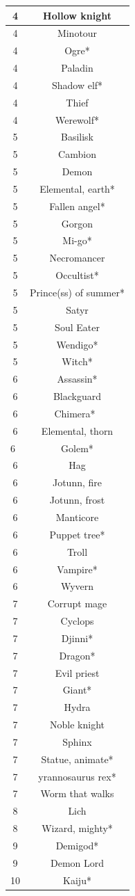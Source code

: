 \begin{longtable}{|c|c|}
4 & Hollow knight \\ \hline
4 & Minotour \\ \hline
4 & Ogre* \\ \hline
4 & Paladin \\ \hline
4 & Shadow elf* \\ \hline
4 & Thief \\ \hline
4 & Werewolf* \\ \hline
5 & Basilisk \\ \hline
5 & Cambion \\ \hline
5 & Demon \\ \hline
5 & Elemental, earth* \\ \hline
5 & Fallen angel* \\ \hline
5 & Gorgon \\ \hline
5 & Mi-go* \\ \hline
5 & Necromancer \\ \hline
5 & Occultist* \\ \hline
5 & Prince(ss) of summer* \\ \hline
5 & Satyr \\ \hline
5 & Soul Eater \\ \hline
5 & Wendigo* \\ \hline
5 & Witch* \\ \hline
6 & Assassin* \\ \hline
6 & Blackguard \\ \hline
6 & Chimera*  \\ \hline
6 & Elemental, thorn \\ \hline
6  & Golem* \\ \hline
6 & Hag \\ \hline
6 & Jotunn, fire \\ \hline
6 & Jotunn, frost \\ \hline
6 & Manticore \\ \hline
6 & Puppet tree* \\ \hline
6 & Troll \\ \hline
6 & Vampire* \\ \hline
6 & Wyvern \\ \hline
7 & Corrupt mage \\ \hline
7 & Cyclops \\ \hline
7 & Djinni* \\ \hline
7 & Dragon* \\ \hline
7 & Evil priest \\ \hline
7 & Giant* \\ \hline
7 & Hydra \\ \hline
7 & Noble knight \\ \hline
7 & Sphinx \\ \hline
7 & Statue, animate* \\ \hline
7 & yrannosaurus rex* \\ \hline
7 & Worm that walks \\ \hline
8 & Lich \\ \hline
8 & Wizard, mighty* \\ \hline
9 & Demigod* \\ \hline
9 & Demon Lord \\ \hline
10 & Kaiju* \\ \hline


\end{longtable}
